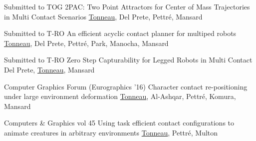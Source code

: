 \documentclass{tccv}
\begin{document}
\begin{eventlist}

\item {Submitted to TOG} 
{2PAC: Two Point Attractors for Center of Mass
Trajectories in Multi Contact Scenarios}
{\underline{Tonneau}, Del Prete, Pettr\'e, Mansard}

\item {Submitted to T-RO} 
{An efficient acyclic contact planner for multiped robots}
{\underline{Tonneau}, Del Prete, Pettr\'e, Park, Manocha, Mansard}

\item {Submitted to T-RO} 
{Zero Step Capturability for Legged Robots in Multi Contact}
{Del Prete, \underline{Tonneau}, Mansard}

\item {Computer Graphics Forum (Eurographics '16)} 
{Character contact re-positioning under large environment deformation}
{\underline{Tonneau}, Al-Ashqar, Pettr\'e, Komura, Mansard}

\item {Computers \& Graphics vol 45} 
{Using task efficient contact configurations to animate 
creatures in arbitrary environments}
{\underline{Tonneau}, Pettr\'e, Multon}



\end{eventlist}

\end{document}
